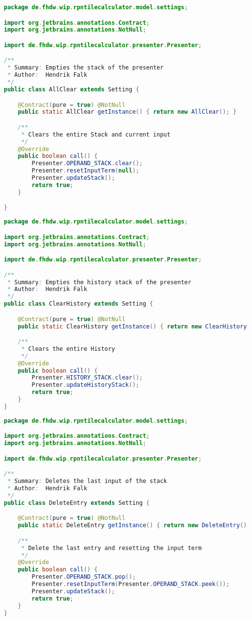 \begin{lstlisting}[caption=AllClear (Falk),label=list:AllClear,language=Java]
package de.fhdw.wip.rpntilecalculator.model.settings;

import org.jetbrains.annotations.Contract;
import org.jetbrains.annotations.NotNull;

import de.fhdw.wip.rpntilecalculator.presenter.Presenter;

/**
 * Summary: Empties the stack of the presenter
 * Author:  Hendrik Falk
 */
public class AllClear extends Setting {

    @Contract(pure = true) @NotNull
    public static AllClear getInstance() { return new AllClear(); }

    /**
     * Clears the entire Stack and current input
     */
    @Override
    public boolean call() {
        Presenter.OPERAND_STACK.clear();
        Presenter.resetInputTerm(null);
        Presenter.updateStack();
        return true;
    }

}
\end{lstlisting}    

\begin{lstlisting}[caption=ClearHistory (Falk),label=list:ClearHistory,language=Java]
package de.fhdw.wip.rpntilecalculator.model.settings;

import org.jetbrains.annotations.Contract;
import org.jetbrains.annotations.NotNull;

import de.fhdw.wip.rpntilecalculator.presenter.Presenter;

/**
 * Summary: Empties the history stack of the presenter
 * Author:  Hendrik Falk
 */
public class ClearHistory extends Setting {

    @Contract(pure = true) @NotNull
    public static ClearHistory getInstance() { return new ClearHistory(); }

    /**
     * Clears the entire History
     */
    @Override
    public boolean call() {
        Presenter.HISTORY_STACK.clear();
        Presenter.updateHistoryStack();
        return true;
    }
}

\end{lstlisting}    

\begin{lstlisting}[caption=DeleteEntry (Falk),label=list:DeleteEntry,language=Java]
package de.fhdw.wip.rpntilecalculator.model.settings;

import org.jetbrains.annotations.Contract;
import org.jetbrains.annotations.NotNull;

import de.fhdw.wip.rpntilecalculator.presenter.Presenter;

/**
 * Summary: Deletes the last input of the stack
 * Author:  Hendrik Falk
 */
public class DeleteEntry extends Setting {

    @Contract(pure = true) @NotNull
    public static DeleteEntry getInstance() { return new DeleteEntry(); }

    /**
     * Delete the last entry and resetting the input term
     */
    @Override
    public boolean call() {
        Presenter.OPERAND_STACK.pop();
        Presenter.resetInputTerm(Presenter.OPERAND_STACK.peek());
        Presenter.updateStack();
        return true;
    }
}
\end{lstlisting}    

